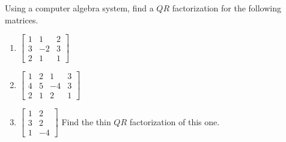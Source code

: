 \begin{enumialphparenastyle}
\begin{ex} Using a computer algebra system, find a $QR$ factorization for the
following matrices.

\begin{enumerate}
\item $\left[ 
\begin{array}{rrr}
1 & 1 & 2 \\ 
3 & -2 & 3 \\ 
2 & 1 & 1
\end{array}
\right] \ $

\item $\left[ 
\begin{array}{rrrr}
1 & 2 & 1 & 3 \\ 
4 & 5 & -4 & 3 \\ 
2 & 1 & 2 & 1
\end{array}
\right] \ $

\item $\left[ 
\begin{array}{rr}
1 & 2 \\ 
3 & 2 \\ 
1 & -4
\end{array}
\right] \allowbreak $ Find the thin $QR$ factorization of this one.
\end{enumerate}
\end{ex}

\end{enumialphparenastyle}